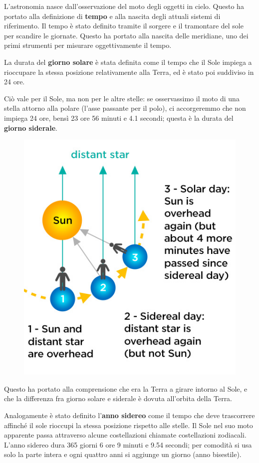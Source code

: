 L'astronomia nasce dall'osservazione del moto degli oggetti in cielo. Questo ha portato alla definizione di \textbf{tempo} e alla nascita degli attuali sistemi di riferimento. Il tempo è stato definito tramite il sorgere e il tramontare del sole per scandire le giornate. Questo ha portato alla nascita delle meridiane, uno dei primi strumenti per misurare oggettivamente il tempo.

La durata del \textbf{giorno solare} è stata definita come il tempo che il Sole impiega a rioccupare la stessa posizione relativamente alla Terra, ed è stato poi suddiviso in 24 ore.

Ciò vale per il Sole, ma non per le altre stelle: se osservassimo il moto di una stella attorno alla polare (l'asse passante per il polo), ci accorgeremmo che non impiega 24 ore, bensì 23 ore 56 minuti e 4.1 secondi; questa è la durata del \textbf{giorno siderale}.

\begin{figure}[h!]
   \centering
   \includegraphics[width=8 cm]{immagini/giorno_solare_e_siderale.png}
\end{figure}

Questo ha portato alla comprensione che era la Terra a girare intorno al Sole, e che la differenza fra giorno solare e siderale è dovuta all'orbita della Terra.

Analogamente è stato definito l'\textbf{anno sidereo} come il tempo che deve trascorrere affinché il sole rioccupi la stessa posizione rispetto alle stelle. Il Sole nel suo moto apparente passa attraverso alcune costellazioni chiamate costellazioni zodiacali. L'anno sidereo dura 365 giorni 6 ore 9 minuti e 9.54 secondi; per comodità si usa solo la parte intera e ogni quattro anni si aggiunge un giorno (anno bisestile).


